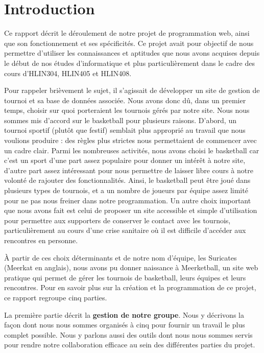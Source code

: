 \documentclass[12pt]{report}
\begin{document}
		\chapter{Introduction}
		\par
        Ce rapport décrit le déroulement de notre projet de programmation web, ainsi que son fonctionnement et ses spécificités. Ce projet avait pour objectif de nous permettre d’utiliser les connaissances et aptitudes que nous avons acquises depuis le début de nos études d’informatique et plus particulièrement dans le cadre des cours d’HLIN304, HLIN405 et HLIN408.
		    
	    \bigskip
		\par
        Pour rappeler brièvement le sujet, il s’agissait de développer un site de gestion de tournoi et sa base de données associée. Nous avons donc dû, dans un premier temps, choisir sur quoi porteraient les tournois gérés par notre site. Nous nous sommes mis d’accord sur le basketball pour plusieurs raisons. D’abord, un tournoi sportif (plutôt que festif) semblait plus approprié au travail que nous voulions produire : des règles plus strictes nous permettaient de commencer avec un cadre clair. Parmi les nombreuses activités, nous avons choisi le basketball car c’est un sport d’une part assez populaire pour donner un intérêt à notre site, d’autre part assez intéressant pour nous permettre de laisser libre cours à notre volonté de rajouter des fonctionnalités. Ainsi, le basketball peut être joué dans plusieurs types de tournois, et a un nombre de joueurs par équipe assez limité pour ne pas nous freiner dans notre programmation. Un autre choix important que nous avons fait est celui de proposer un site accessible et simple d’utilisation pour permettre aux supporters de conserver le contact avec les tournois, particulièrement au cours d’une crise sanitaire où il est difficile d’accéder aux rencontres en personne.
		    
	    \bigskip
	    \par
	    À partir de ces choix déterminants et de notre nom d’équipe, les Suricates (Meerkat en anglais), nous avons pu donner naissance à Meerketball, un site web pratique qui permet de gérer les tournois de basketball, leurs équipes et leurs rencontres. Pour en savoir plus sur la création et la programmation de ce projet, ce rapport regroupe cinq parties.
		    
	    \bigskip
	    \par
	    La première partie décrit la \textbf{gestion de notre groupe}. Nous y décrivons la façon dont nous nous sommes organisés à cinq pour fournir un travail le plus complet possible. Nous y parlons aussi des outils dont nous nous sommes servis pour rendre notre collaboration efficace au sein des différentes parties du projet.
		    
\end{document}
